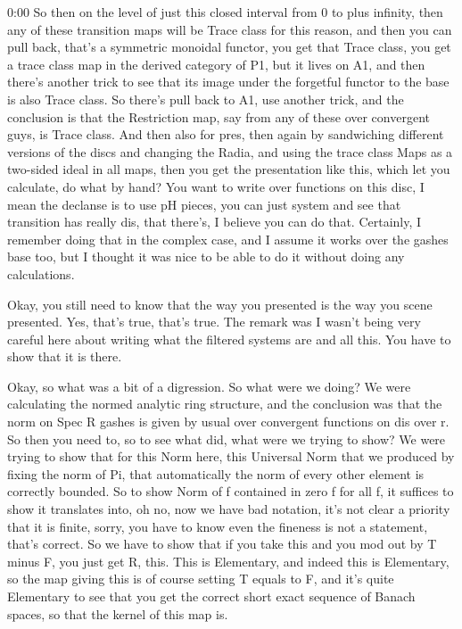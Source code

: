 \begin{unfinished}{0:00}
So then on the level of just this closed interval from 0 to plus infinity, then any of these transition maps will be Trace class for this reason, and then you can pull back, that's a symmetric monoidal functor, you get that Trace class, you get a trace class map in the derived category of P1, but it lives on A1, and then there's another trick to see that its image under the forgetful functor to the base is also Trace class. So there's pull back to A1, use another trick, and the conclusion is that the Restriction map, say from any of these over convergent guys, is Trace class. And then also for pres, then again by sandwiching different versions of the discs and changing the Radia, and using the trace class Maps as a two-sided ideal in all maps, then you get the presentation like this, which let you calculate, do what by hand? You want to write over functions on this disc, I mean the declanse is to use pH pieces, you can just system and see that transition has really dis, that there's, I believe you can do that. Certainly, I remember doing that in the complex case, and I assume it works over the gashes base too, but I thought it was nice to be able to do it without doing any calculations.

Okay, you still need to know that the way you presented is the way you scene presented. Yes, that's true, that's true. The remark was I wasn't being very careful here about writing what the filtered systems are and all this. You have to show that it is there.

Okay, so what was a bit of a digression. So what were we doing? We were calculating the normed analytic ring structure, and the conclusion was that the norm on Spec R gashes is given by usual over convergent functions on dis over r. So then you need to, so to see what did, what were we trying to show? We were trying to show that for this Norm here, this Universal Norm that we produced by fixing the norm of Pi, that automatically the norm of every other element is correctly bounded. So to show Norm of f contained in zero f for all f, it suffices to show it translates into, oh no, now we have bad notation, it's not clear a priority that it is finite, sorry, you have to know even the fineness is not a statement, that's correct. So we have to show that if you take this and you mod out by T minus F, you just get R, this. This is Elementary, and indeed this is Elementary, so the map giving this is of course setting T equals to F, and it's quite Elementary to see that you get the correct short exact sequence of Banach spaces, so that the kernel of this map is.


\end{unfinished}
